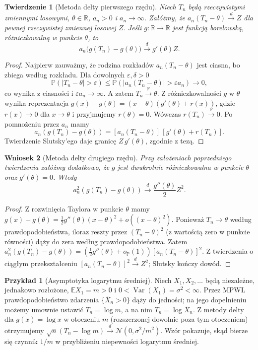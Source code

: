 \documentclass[11pt,a4paper,oneside]{report}
\numberwithin{equation}{chapter}
\theoremstyle{plain}
\newtheorem{twierdzenie}{Twierdzenie}[chapter]
\newtheorem{wniosek}[twierdzenie]{Wniosek}
\theoremstyle{definition}
\newtheorem{przyklad}{Przykład}[chapter]
\theoremstyle{remark}
\newcommand{\R}{\mathbb{R}}
\newcommand{\Prob}{\mathbb{P}}
\newcommand{\E}{\mathbb{E}}
\newcommand{\Var}{\operatorname{Var}}
\newcommand{\Normal}{\mathcal{N}}
\begin{document}
\begin{twierdzenie}[Metoda delty pierwszego rzędu]
Niech $T_n$ będą rzeczywistymi zmiennymi losowymi,
$\theta\in\R$, $a_n>0$ i $a_n\to\infty$.
Załóżmy, że $a_n(T_n-\theta)\xrightarrow d Z$
dla pewnej rzeczywistej zmiennej losowej $Z$.
Jeśli $g:\R\to\R$ jest funkcją borelowską, różniczkowalną
w punkcie $\theta$, to
\[
a_n\bigl(g(T_n)-g(\theta)\bigr)
\xrightarrow d g'(\theta)Z.
\]
\end{twierdzenie}
\begin{proof}
Najpierw zauważmy, że rodzina rozkładów
$a_n(T_n-\theta)$ jest ciasna, bo zbiega według
rozkładu. Dla dowolnych $\varepsilon,\delta>0$
\[
\Prob(|T_n-\theta|>\varepsilon)
\leq\Prob(|a_n(T_n-\theta)|>\varepsilon a_n)
\longrightarrow0,
\]
co wynika z ciasności i $\varepsilon a_n\to\infty$.
A zatem $T_n\xrightarrow{\Prob}\theta$.
Z różniczkowalności $g$ w $\theta$ wynika
reprezentacja
$g(x)-g(\theta)=(x-\theta)(g'(\theta)+r(x))$,
gdzie $r(x)\to0$ dla $x\to\theta$
i przyjmujemy $r(\theta)=0$.
Wówczas $r(T_n)\xrightarrow{\Prob}0$.
Po pomnożeniu przez $a_n$ mamy
\[
a_n(g(T_n)-g(\theta))
=[a_n(T_n-\theta)]\,[g'(\theta)+r(T_n)].
\]
Twierdzenie Slutsky'ego daje granicę
$Z\,g'(\theta)$, zgodnie z tezą.
\end{proof}

\begin{wniosek}[Metoda delty drugiego rzędu]
Przy założeniach poprzedniego twierdzenia załóżmy
dodatkowo, że $g$ jest dwukrotnie różniczkowalna
w punkcie $\theta$ oraz $g'(\theta)=0$.
Wtedy
\[
a_n^2(g(T_n)-g(\theta))
\xrightarrow d\frac{g''(\theta)}2Z^2.
\]
\end{wniosek}
\begin{proof}
Z rozwinięcia Taylora w punkcie $\theta$ mamy
$g(x)-g(\theta)=\frac12g''(\theta)(x-\theta)^2
+o((x-\theta)^2)$. Ponieważ $T_n\to\theta$
według prawdopodobieństwa, iloraz reszty przez
$(T_n-\theta)^2$ (z wartością zero w punkcie
równości) dąży do zera według prawdopodobieństwa.
Zatem
$a_n^2(g(T_n)-g(\theta))
=(\frac12g''(\theta)+o_{\Prob}(1))
[a_n(T_n-\theta)]^2$.
Z twierdzenia o ciągłym przekształceniu
$[a_n(T_n-\theta)]^2\xrightarrow d Z^2$;
Slutsky kończy dowód.
\end{proof}

\begin{przyklad}[Asymptotyka logarytmu średniej]
Niech $X_1,X_2,\ldots$ będą niezależne, jednakowo
rozłożone, $\E X_1=m>0$ i
$0<\Var(X_1)=\sigma^2<\infty$.
Przez MPWL prawdopodobieństwo zdarzenia
$\{\overline X_n>0\}$ dąży do jedności;
na jego dopełnieniu możemy umownie ustawić
$T_n=\log m$, a na nim $T_n=\log\overline X_n$.
Z metody delty dla $g(x)=\log x$ w otoczeniu $m$
(rozszerzonej dowolnie poza tym otoczeniem)
otrzymujemy
$\sqrt n(T_n-\log m)\xrightarrow d
\Normal(0,\sigma^2/m^2)$.
Wzór pokazuje, skąd bierze się czynnik $1/m$
w przybliżeniu niepewności logarytmu średniej.
\end{przyklad}
\end{document}
